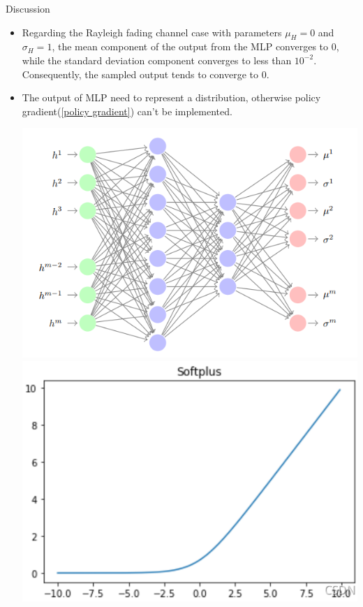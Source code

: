 \documentclass[hyperref={bookmarks=false}]{beamer}
\numberwithin{figure}{section}
\begin{document}
\begin{frame}[allowframebreaks]{Discussion}
\begin{itemize}
  \item Regarding the Rayleigh fading channel case with parameters $\mu_H = 0$ 
    and $\sigma_H = 1$, the mean component of the output from the MLP converges 
    to 0, while the standard deviation component converges to less than $10^{-2}$. 
    Consequently, the sampled output tends to converge to 0.
  \item  The output of MLP need to represent a distribution, otherwise policy
    gradient(\ref{policy gradient}) can't be implemented.
    \begin{center}
      \includegraphics[width=0.45\linewidth]{figures/240509/MLP.png}
      \includegraphics[width=0.45\linewidth]{figures/240509/softplus.png}
    \end{center}

  \framebreak


\end{itemize}
\end{frame}
\end{document}
